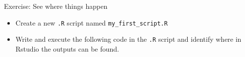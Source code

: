 \documentclass[
  10pt,
  ignorenonframetext,
]{beamer}
\newenvironment{Shaded}{\begin{snugshade}}{\end{snugshade}}
\newcommand{\DecValTok}[1]{\textcolor[rgb]{0.86,0.86,0.80}{#1}}
\newcommand{\KeywordTok}[1]{\textcolor[rgb]{0.94,0.87,0.69}{#1}}
\newcommand{\NormalTok}[1]{\textcolor[rgb]{0.80,0.80,0.80}{#1}}
\newcommand{\OperatorTok}[1]{\textcolor[rgb]{0.94,0.94,0.82}{#1}}
\newcommand{\StringTok}[1]{\textcolor[rgb]{0.80,0.58,0.58}{#1}}
\providecommand{\tightlist}{%
  \setlength{\itemsep}{0pt}\setlength{\parskip}{0pt}}
\begin{document}
\begin{frame}[fragile]{Exercise: See where things happen}
\protect\hypertarget{exercise-see-where-things-happen}{}

\begin{itemize}
\tightlist
\item
  Create a new \texttt{.R} script named \texttt{my\_first\_script.R}
\item
  Write and execute the following code in the \texttt{.R} script and
  identify where in Rstudio the outputs can be found.
\end{itemize}

\begin{Shaded}
\end{Shaded}

\end{frame}
\end{document}
